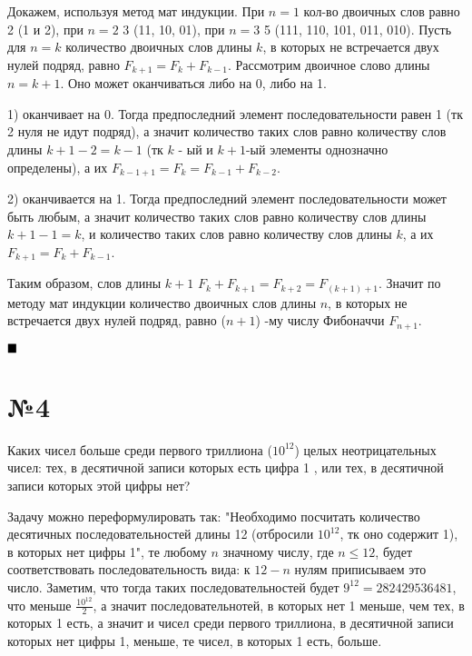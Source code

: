 \documentclass[a4paper, 16pt]{article}
\newenvironment{proof}[1][Доказательство]{%
	\begin{trivlist}
		\item[\hskip \labelsep {\bfseries #1:}]
		\item \hspace{14pt}
	}{
		$ \hfill\blacksquare $
	\end{trivlist}
	\hfill\break
}
\newenvironment{solution}[1][Решение]{%
	\begin{trivlist}
		\item[\hskip \labelsep {\bfseries #1:}]
		\item \hspace{15pt}
	}{
	\end{trivlist}
}
\begin{document}
		\begin{proof}
			Докажем, используя метод мат индукции. При $n=1$ кол-во двоичных слов равно 2 (1 и 2), при $n=2$ 3 (11, 10, 01), при $ n=3$  5 (111, 110, 101, 011, 010). Пусть для $n = k$ количество двоичных слов длины
			$k$, в которых не встречается двух нулей подряд, равно $F_{k + 1} = F_k + F_{k-1}$. Рассмотрим двоичное слово длины $n = k + 1$. Оно может оканчиваться либо на 0, либо на 1. 
			
			1) оканчивает на 0. Тогда предпоследний элемент последовательности равен 1 (тк 2 нуля не идут подряд), а значит количество таких слов равно количеству слов длины $k + 1 - 2 = k - 1$ (тк $k$ - ый и $k + 1$-ый элементы однозначно определены), а их $F_{k - 1+1} = F_k = F_{k-1} + F_{k-2}$. 
			
			2) оканчивается на 1. Тогда предпоследний элемент последовательности может быть любым, а значит количество таких слов равно количеству слов длины $k + 1 - 1 = k$, и количество таких слов равно количеству слов длины $k$, а их $F_{k + 1} = F_k + F_{k-1}$.
			
			Таким образом, слов длины $k + 1$ $F_k + F_{k +1} = F_{k+2} = F_{(k+1) + 1}$. Значит по методу мат индукции количество двоичных слов длины
			$n$, в которых не встречается двух нулей подряд, равно
			($n+ 1$)
			-му числу Фибоначчи
			$F_{n+1}$.
		\end{proof}
	
	\section*{№4}
	
		Каких чисел больше среди первого триллиона ($10^{12}$) целых неотрицательных чисел: тех, в десятичной
		записи которых есть цифра
		1
		, или тех, в десятичной записи которых этой цифры нет?
		
		\begin{solution}
			Задачу можно переформулировать так: "Необходимо посчитать количество десятичных последовательностей длины 12 (отбросили $10^{12}$, тк оно содержит 1), в которых нет цифры 1", те любому $n$ значному числу, где $n \leq 12$, будет соответствовать последовательность вида: к $12 - n$ нулям приписываем это число. Заметим, что тогда таких последовательностей будет $9^{12} = 282429536481$, что меньше $\frac{10^{12}}{2}$, а значит последовательнотей, в которых нет 1 меньше, чем тех, в которых 1 есть, а значит и чисел среди первого триллиона, в десятичной
			записи которых нет цифры 1, меньше, те чисел, в которых 1 есть, больше.
		\end{solution}
	
\end{document}
